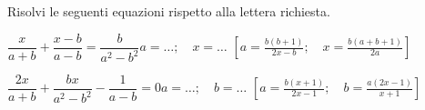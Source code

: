 \begin{esercizio}[*]
\label{ese:20.70}
Risolvi le seguenti equazioni rispetto alla lettera richiesta.
\TabPositions{5cm}
\begin{enumeratea}
 \item \(\dfrac{x}{a+b}+\dfrac{x-b}{a-b}=
        \dfrac{b}{a^{2}-b^{2}}\)\tab\(a=\ldots;\quad x=\ldots\)
  \hfill \(\left[a=\frac{b(b+1)}{2x-b}; \quad x=\frac{b(a+b+1)}{2a}\right]\)
 \item \(\dfrac{2x}{a+b}+\dfrac{bx}{a^{2}-b^{2}}-\dfrac{1}{a-b}=0\)\tab\(a=
        \ldots; \quad b=\ldots\)
  \hfill \(\left[a=\frac{b(x+1)}{2x-1}; \quad b=\frac{a(2x-1)}{x+1}\right]\)
\end{enumeratea}
\end{esercizio}
% 
% 
